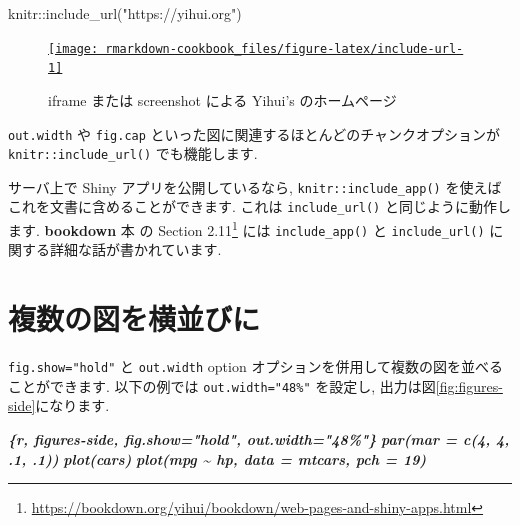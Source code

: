 \documentclass[
  11pt,
  lualatex,ja=standard,jafont=noto]{bxjsreport}
\newenvironment{Shaded}{\begin{snugshade}}{\end{snugshade}}
\newcommand{\FunctionTok}[1]{\textcolor[rgb]{0.00,0.00,0.00}{#1}}
\newcommand{\InformationTok}[1]{\textcolor[rgb]{0.56,0.35,0.01}{\textbf{\textit{#1}}}}
\newcommand{\NormalTok}[1]{#1}
\newcommand{\SpecialCharTok}[1]{\textcolor[rgb]{0.00,0.00,0.00}{#1}}
\newcommand{\StringTok}[1]{\textcolor[rgb]{0.31,0.60,0.02}{#1}}
\let\oldhref\href
\renewcommand{\href}[2]{#2\footnote{\url{#1}}}
\begin{document}
\let\ooldhref\href
\let\href\oldhref

\begin{Shaded}
\begin{Highlighting}[numbers=left,,]
\NormalTok{knitr}\SpecialCharTok{::}\FunctionTok{include\_url}\NormalTok{(}\StringTok{"https://yihui.org"}\NormalTok{)}
\end{Highlighting}
\end{Shaded}

\begin{figure}

{\centering \oldhref{https://yihui.org}{\texttt{[image: rmarkdown-cookbook\_files/figure-latex/include-url-1]} }

}

\caption{iframe または screenshot による Yihui's のホームページ}\label{fig:include-url}
\end{figure}

\let\href\ooldhref

\texttt{out.width} や \texttt{fig.cap} といった図に関連するほとんどのチャンクオプションが \texttt{knitr::include\_url()} でも機能します.

サーバ上で Shiny アプリを公開しているなら, \texttt{knitr::include\_app()} を使えばこれを文書に含めることができます. これは \texttt{include\_url()} と同じように動作します. \textbf{bookdown} 本 \autocite{bookdown2016} の \href{https://bookdown.org/yihui/bookdown/web-pages-and-shiny-apps.html}{Section 2.11} には \texttt{include\_app()} と \texttt{include\_url()} に関する詳細な話が書かれています.

\hypertarget{figures-side}{%
\section{複数の図を横並びに}\label{figures-side}}

\texttt{fig.show="hold"} と \texttt{out.width} option オプションを併用して複数の図を並べることができます. 以下の例では \texttt{out.width="48\%"} を設定し, 出力は図\ref{fig:figures-side}になります.

\begin{Shaded}
\begin{Highlighting}[]
\InformationTok{\textasciigrave{}\textasciigrave{}\textasciigrave{}\{r, figures{-}side, fig.show="hold", out.width="48\%"\}}
\InformationTok{par(mar = c(4, 4, .1, .1))}
\InformationTok{plot(cars)}
\InformationTok{plot(mpg \textasciitilde{} hp, data = mtcars, pch = 19)}
\InformationTok{\textasciigrave{}\textasciigrave{}\textasciigrave{}}
\end{Highlighting}
\end{Shaded}
\end{document}
